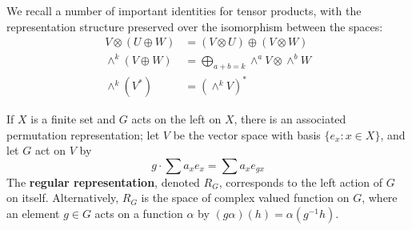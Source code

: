 We recall a number of important identities for tensor products, with the representation structure preserved over the isomorphism between the spaces: \begin{align*}
    V\otimes(U\oplus W) &= (V\otimes U)\oplus(V\otimes W) \\
    \wedge^k(V\oplus W) &= \bigoplus_{a+b=k}\wedge^aV\otimes \wedge^bW \\
    \wedge^k(V^*) &= (\wedge^kV)^*
\end{align*}

If $X$ is a finite set and $G$ acts on the left on $X$, there is an associated permutation representation; let $V$ be the vector space with basis $\{e_x:x \in X\}$, and let $G$ act on $V$ by \begin{equation*}
    g\cdot\sum a_xe_x = \sum a_xe_{gx}
\end{equation*}
The \textbf{regular representation}, denoted $R_G$, corresponds to the left action of $G$ on itself. Alternatively, $R_G$ is the space of complex valued function on $G$, where an element $g \in G$ acts on a function $\alpha$ by $(g\alpha)(h) = \alpha(g^{-1}h)$.



